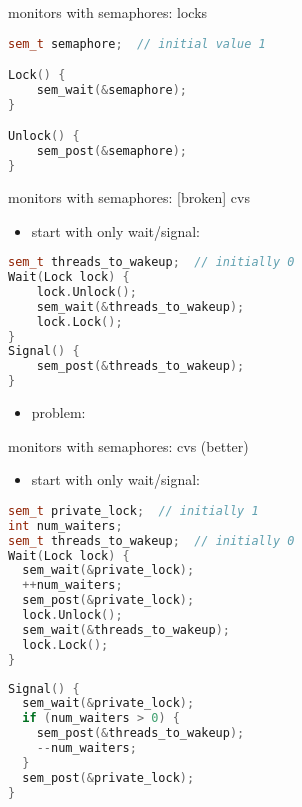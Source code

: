 \begin{frame}[fragile,label=monitorWithSemaphoreLock]{monitors with semaphores: locks}
\begin{lstlisting}[language=C++,style=small]
sem_t semaphore;  // initial value 1

Lock() {
    sem_wait(&semaphore);
}

Unlock() {
    sem_post(&semaphore);
}
\end{lstlisting}
\end{frame}

\begin{frame}[fragile,label=monitorWithSemaphoreCVA1]{monitors with semaphores: [broken] cvs}
\begin{itemize}
\item start with only wait/signal:
\end{itemize}
\begin{lstlisting}[language=C++,style=smaller]
sem_t threads_to_wakeup;  // initially 0
Wait(Lock lock) {
    lock.Unlock();
    sem_wait(&threads_to_wakeup);
    lock.Lock();
}
Signal() {
    sem_post(&threads_to_wakeup);
}
\end{lstlisting}
\begin{itemize}
\item<2-> problem: 
\end{itemize}
\end{frame}

\begin{frame}[fragile,label=monitorWithSemaphoreCVA2]{monitors with semaphores: cvs (better)}
\begin{itemize}
\item start with only wait/signal:
\end{itemize}
\begin{minipage}{0.45\textwidth}
\begin{lstlisting}[language=C++,basicstyle=\fontsize{9.5}{10.5}\tt\selectfont]
sem_t private_lock;  // initially 1
int num_waiters;
sem_t threads_to_wakeup;  // initially 0
Wait(Lock lock) {
  sem_wait(&private_lock);
  ++num_waiters;
  sem_post(&private_lock);
  lock.Unlock();
  sem_wait(&threads_to_wakeup);
  lock.Lock();
}
\end{lstlisting}
\end{minipage}
\begin{minipage}{0.45\textwidth}
\begin{lstlisting}[language=C++,basicstyle=\fontsize{9.5}{10.5}\tt\selectfont]
Signal() {
  sem_wait(&private_lock);
  if (num_waiters > 0) {
    sem_post(&threads_to_wakeup);
    --num_waiters;
  }
  sem_post(&private_lock);
}
\end{lstlisting}
\end{minipage}
\end{frame}

